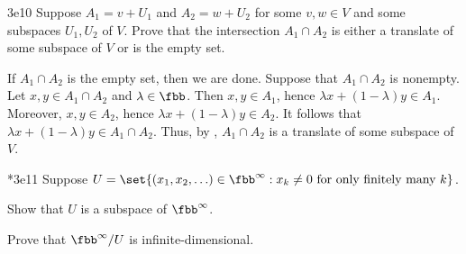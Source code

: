 \begin{exercise}{3e10}
    Suppose $A_1 = v + U_1$ and $A_2 = w + U_2$ for some $v, w \in V$ and some subspaces $U_1, U_2$ of $V$.
	Prove that the intersection $A_1 \cap A_2$ is either a translate of some subspace of $V$ or is the empty set.
\end{exercise}

\begin{sol}
    If $A_1 \cap A_2$ is the empty set, then we are done.
	Suppose that $A_1 \cap A_2$ is nonempty.
	Let $x, y \in A_1 \cap A_2$ and $\lambda \in \fbb$.
	Then $x, y \in A_1$, hence $\lambda x + (1 - \lambda) y \in A_1$.
	Moreover, $x, y \in A_2$, hence $\lambda x + (1 - \lambda) y \in A_2$.
	It follows that $\lambda x + (1 - \lambda) y \in A_1 \cap A_2$.
	Thus, by , $A_1 \cap A_2$ is a translate of some subspace of $V$.
\end{sol}

\begin{exercise}*{3e11}
    Suppose $U = \set{(x_1, x_2, \ldots) \in \fbb^\infty : x_k \neq 0 \text{ for only finitely many } k}$.
    \begin{subexercises}
        \item Show that $U$ is a subspace of $\fbb^\infty$.
        \item Prove that $\fbb^\infty / U$ is infinite-dimensional.
    \end{subexercises}
\end{exercise}

